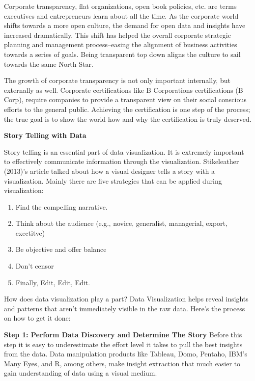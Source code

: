 \documentclass[]{book}
\providecommand{\tightlist}{%
  \setlength{\itemsep}{0pt}\setlength{\parskip}{0pt}}
\theoremstyle{definition}
\theoremstyle{definition}
\theoremstyle{definition}
\theoremstyle{remark}
\begin{document}
\citep{SCORECARDS}

Corporate transparency, flat organizations, open book policies, etc. are
terms executives and entrepreneurs learn about all the time. As the
corporate world shifts towards a more open culture, the demand for open
data and insights have increased dramatically. This shift has helped the
overall corporate strategic planning and management process--easing the
alignment of business activities towards a series of goals. Being
transparent top down aligns the culture to sail towards the same North
Star.

The growth of corporate transparency is not only important internally,
but externally as well. Corporate certifications like B Corporations
certifications (B Corp), require companies to provide a transparent view
on their social conscious efforts to the general public. Achieving the
certification is one step of the process; the true goal is to show the
world how and why the certification is truly deserved.

\textbf{Story Telling with Data}

Story telling is an essential part of data visualization. It is
extremely important to effectively communicate information through the
visualization. Stikeleather (2013)'s article talked about how a visual
designer tells a story with a visualization. Mainly there are five
strategies that can be applied during visualization:

\begin{enumerate}
\def\labelenumi{\arabic{enumi}.}
\tightlist
\item
  Find the compelling narrative.\\
\item
  Think about the audience (e.g., novice, generalist, managerial,
  export, exectitve)\\
\item
  Be objective and offer balance\\
\item
  Don't censor\\
\item
  Finally, Edit, Edit, Edit.
\end{enumerate}

How does data visualization play a part? Data Visualization helps reveal
insights and patterns that aren't immediately visible in the raw data.
Here's the process on how to get it done:

\textbf{Step 1: Perform Data Discovery and Determine The Story} Before
this step it is easy to underestimate the effort level it takes to pull
the best insights from the data. Data manipulation products like
Tableau, Domo, Pentaho, IBM's Many Eyes, and R, among others, make
insight extraction that much easier to gain understanding of data using
a visual medium.
\end{document}

